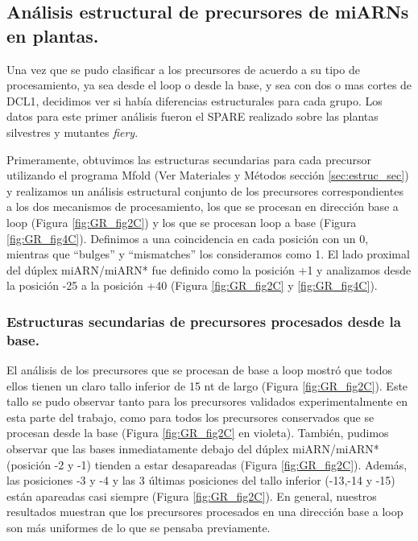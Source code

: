 \subsection{Análisis estructural de precursores de miARNs en plantas.}

Una vez que se pudo clasificar a los precursores de acuerdo a su tipo de procesamiento, ya sea desde el loop o desde la base, y sea con dos o mas cortes de DCL1, decidimos ver si había diferencias estructurales para cada grupo.
Los datos para este primer análisis fueron el SPARE realizado sobre las plantas silvestres y mutantes \textit{fiery}.

Primeramente, obtuvimos las estructuras secundarias para cada precursor  utilizando el programa Mfold\citep{pmid12824337} (Ver Materiales y Métodos sección \ref{sec:estruc_sec}) y realizamos un análisis estructural conjunto de los precursores correspondientes a los dos mecanismos de procesamiento, los que se procesan en dirección base a loop (Figura \ref{fig:GR_fig2C}) y los que se procesan loop a base (Figura \ref{fig:GR_fig4C}).
Definimos a una coincidencia en cada posición con un 0, mientras que ``bulges'' y ``mismatches'' los consideramos como 1.
El lado proximal del dúplex miARN/miARN* fue definido como la posición +1 y analizamos desde la posición -25 a la posición +40 (Figura \ref{fig:GR_fig2C} y \ref{fig:GR_fig4C}). 

\subsubsection{Estructuras secundarias de precursores procesados desde la base.}

El análisis de los precursores que se procesan de base a loop mostró que todos ellos tienen un claro tallo inferior de 15 nt de largo (Figura \ref{fig:GR_fig2C}).
Este tallo se pudo observar tanto para los precursores validados experimentalmente en esta parte del trabajo, como para todos los precursores conservados que se procesan desde la base (Figura \ref{fig:GR_fig2C} en violeta).
También, pudimos observar que las bases inmediatamente debajo del dúplex miARN/miARN* (posición -2 y -1) tienden a estar desapareadas (Figura \ref{fig:GR_fig2C}).
Además, las posiciones -3 y -4 y las 3 últimas posiciones del tallo inferior (-13,-14 y -15) están apareadas casi siempre (Figura \ref{fig:GR_fig2C}).
En general, nuestros resultados muestran que los precursores procesados en una dirección base a loop son más uniformes de lo que se pensaba previamente.

